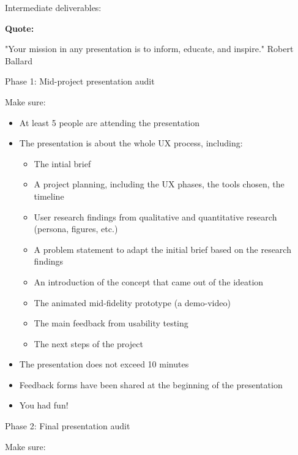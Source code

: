 Intermediate deliverables:

\textbf{Quote:}

"Your mission in any presentation is to inform, educate, and inspire." Robert Ballard

\medskip

Phase 1: Mid-project presentation audit

Make sure:

\begin{itemize}
\item At least 5 people are attending the presentation
\item The presentation is about the whole UX process, including:
\begin{itemize}
\item The intial brief
\item A project planning, including the UX phases, the tools chosen, the timeline
\item User research findings from qualitative and quantitative research (persona, figures, etc.)
\item A problem statement to adapt the initial brief based on the research findings
\item An introduction of the concept that came out of the ideation
\item The animated mid-fidelity prototype (a demo-video)
\item The main feedback from usability testing
\item The next steps of the project
\end{itemize}
\item The presentation does not exceed 10 minutes
\item Feedback forms have been shared at the beginning of the presentation
\item You had fun!
\end{itemize}

\medskip

Phase 2: Final presentation audit

Make sure:

